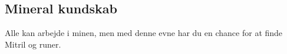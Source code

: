 \subsection*{Mineral kundskab}
Alle kan arbejde i minen, men med denne evne har du en chance for at finde Mitril og runer.
